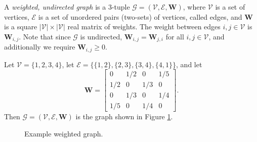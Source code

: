 \begin{defn}
    A \emph{weighted, undirected graph} is a $3$-tuple $\mathcal{G} = (\mathcal{V}, \mathcal{E}, \bm{W})$, where $\mathcal{V}$ is a set of vertices, $\mathcal{E}$ is a set of unordered pairs (two-sets) of vertices, called edges, and $\bm{W}$ is a square $|\mathcal{V}| \times |\mathcal{V}|$ real matrix of weights. The weight between edges $i, j \in \mathcal{V}$ is $\bm{W}_{i, j}$. Note that since $\mathcal{G}$ is undirected, $\bm{W}_{i,j} = \bm{W}_{j, i}$ for all $i, j \in \mathcal{V}$, and additionally we require $\bm{W}_{i, j} \geq 0$.
\end{defn}

\begin{exmp}
    Let $\mathcal{V} = \{1, 2, 3, 4\}$, let $\mathcal{E} = \{\{1, 2\}, \{2, 3\}, \{3, 4\}, \{4, 1\}\}$, and let
    \[\bm{W} = \begin{bmatrix}
        0 & 1/2 & 0 & 1/5 \\
        1/2 & 0 & 1/3 & 0 \\
        0 & 1/3 & 0 & 1/4 \\
        1/5 & 0 & 1/4 & 0
    \end{bmatrix}.\] Then $\mathcal{G} = (\mathcal{V}, \mathcal{E}, \bm{W})$ is the graph shown in Figure \ref{fig:example-weighted-graph}.
\end{exmp}

\begin{figure}[ht!]
    \centering
\caption{Example weighted graph.}
\label{fig:example-weighted-graph}
\end{figure}

